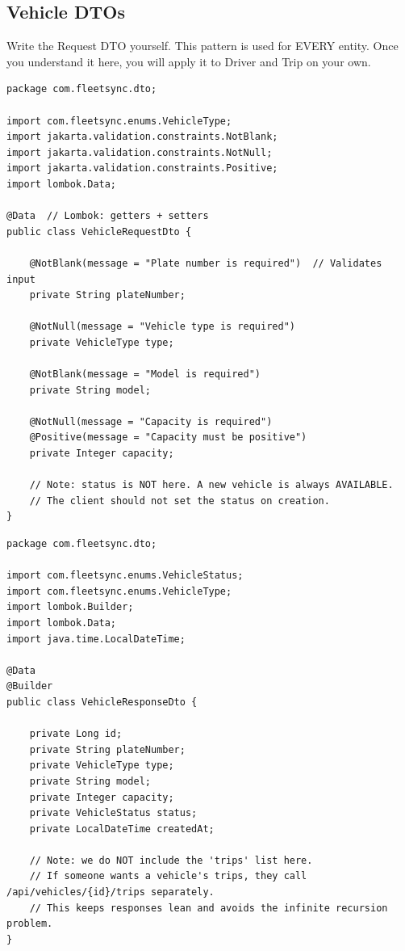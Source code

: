 \documentclass[12pt,a4paper]{report}
\begin{document}
\subsection{Vehicle DTOs}

\begin{tcolorbox}[handbox]
Write the Request DTO yourself. This pattern is used for EVERY entity. Once you understand it here, you will apply it to Driver and Trip on your own.
\end{tcolorbox}

\begin{lstlisting}[caption=VehicleRequestDto.java -- What client sends to create/update a vehicle]
package com.fleetsync.dto;

import com.fleetsync.enums.VehicleType;
import jakarta.validation.constraints.NotBlank;
import jakarta.validation.constraints.NotNull;
import jakarta.validation.constraints.Positive;
import lombok.Data;

@Data  // Lombok: getters + setters
public class VehicleRequestDto {

    @NotBlank(message = "Plate number is required")  // Validates input
    private String plateNumber;

    @NotNull(message = "Vehicle type is required")
    private VehicleType type;

    @NotBlank(message = "Model is required")
    private String model;

    @NotNull(message = "Capacity is required")
    @Positive(message = "Capacity must be positive")
    private Integer capacity;

    // Note: status is NOT here. A new vehicle is always AVAILABLE.
    // The client should not set the status on creation.
}
\end{lstlisting}

\begin{lstlisting}[caption=VehicleResponseDto.java -- What the API returns]
package com.fleetsync.dto;

import com.fleetsync.enums.VehicleStatus;
import com.fleetsync.enums.VehicleType;
import lombok.Builder;
import lombok.Data;
import java.time.LocalDateTime;

@Data
@Builder
public class VehicleResponseDto {

    private Long id;
    private String plateNumber;
    private VehicleType type;
    private String model;
    private Integer capacity;
    private VehicleStatus status;
    private LocalDateTime createdAt;

    // Note: we do NOT include the 'trips' list here.
    // If someone wants a vehicle's trips, they call /api/vehicles/{id}/trips separately.
    // This keeps responses lean and avoids the infinite recursion problem.
}
\end{lstlisting}
\end{document}
